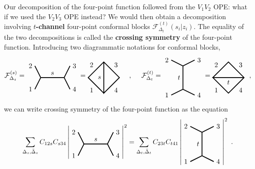 \documentclass[12pt,a4paper,notitlepage]{report}
\numberwithin{equation}{section}
\theoremstyle{break}
\begin{document}
Our decomposition of the four-point function followed from the $V_1V_2$ OPE: what if we used the $V_2V_3$ OPE instead? We would then obtain a decomposition involving \textbf{\boldmath $t$-channel} four-point conformal blocks  $\mathcal{F}^{(t)}_{\Delta_t}(s_i|z_i)$.
The equality of the two decompositions is called the \textbf{\boldmath crossing symmetry} of the four-point function.
Introducing two diagrammatic notations for conformal blocks, 
\begin{align}
 \mathcal{F}^{(s)}_{\Delta_s}  =  
\begin{tikzpicture}[baseline=(current  bounding  box.center), very thick, scale = .3]
\draw (-1,2) node [left] {$2$} -- (0,0) -- node [above] {$s$} (4,0) -- (5,2) node [right] {$3$};
\draw (-1,-2) node [left] {$1$} -- (0,0);
\draw (4,0) -- (5,-2) node [right] {$4$};
\end{tikzpicture}
=
\begin{tikzpicture}[baseline=(current  bounding  box.center), very thick, scale = .4]
\draw (0, -2) -- node [below left] {$1$} (-2, 0) -- node [above left] {$2$} (0, 2) -- node [above right] {$3$} (2, 0) -- node [below right] {$4$} (0, -2) -- node [left] {$s$} (0, 2); 
\end{tikzpicture}
\quad\ ,\quad\
 \mathcal{F}^{(t)}_{\Delta_t}  =  
\begin{tikzpicture}[baseline=(current  bounding  box.center), very thick, scale = .3]
 \draw (-2,3) node [left] {$2$} -- (0,2) -- node [left] {$t$} (0,-2) -- (-2, -3) node [left] {$1$};
\draw (0,2) -- (2,3) node [right] {$3$};
\draw (0,-2) -- (2, -3) node [right] {$4$};
\end{tikzpicture}
=
\begin{tikzpicture}[baseline=(current  bounding  box.center), very thick, scale = .4]
\draw (-2, 0) -- node [above left] {$2$} (0, 2) -- node [above right] {$3$} (2, 0) -- node [below right] {$4$} (0, -2) -- node [below left] {$1$} (-2, 0) -- node [below] {$t$} (2, 0); 
\end{tikzpicture}
\ \ ,
\end{align}
we can write crossing symmetry of the four-point function as the equation
\begin{align}
 \sum_{\Delta_s,\bar{\Delta}_s} C_{12s} C_{s34} \left| 
 \begin{tikzpicture}[baseline=(current  bounding  box.center), very thick, scale = .3]
\draw (-1,2) node [left] {$2$} -- (0,0) -- node [above] {$s$} (4,0) -- (5,2) node [right] {$3$};
\draw (-1,-2) node [left] {$1$} -- (0,0);
\draw (4,0) -- (5,-2) node [right] {$4$};
\end{tikzpicture} 
\right|^2 = \sum_{\Delta_t,\bar{\Delta}_t} C_{23t}C_{t41} \left|
\begin{tikzpicture}[baseline=(current  bounding  box.center), very thick, scale = .3]
 \draw (-2,3) node [left] {$2$} -- (0,2) -- node [left] {$t$} (0,-2) -- (-2, -3) node [left] {$1$};
\draw (0,2) -- (2,3) node [right] {$3$};
\draw (0,-2) -- (2, -3) node [right] {$4$};
\end{tikzpicture}
\right|^2\ .
\label{csd}
\end{align}
\end{document}

